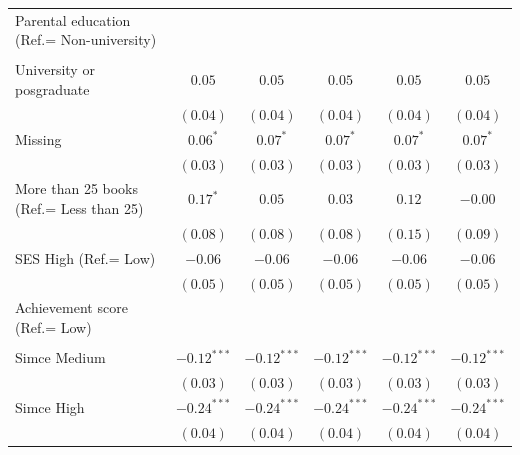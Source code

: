 \documentclass[
  12pt,
  letterpaper,
]{article}
\begin{document}
\begin{table}
{\begin{center}
{\begin{threeparttable}
\begin{tabular}{l c c c c c}
Parental education (Ref.= Non-university)   &               &               &               &               &               \\
                                            &               &               &               &               &               \\
\quad University or posgraduate             & $0.05$        & $0.05$        & $0.05$        & $0.05$        & $0.05$        \\
                                            & $(0.04)$      & $(0.04)$      & $(0.04)$      & $(0.04)$      & $(0.04)$      \\
\quad Missing                               & $0.06^{*}$    & $0.07^{*}$    & $0.07^{*}$    & $0.07^{*}$    & $0.07^{*}$    \\
                                            & $(0.03)$      & $(0.03)$      & $(0.03)$      & $(0.03)$      & $(0.03)$      \\
More than 25 books (Ref.= Less than 25)     & $0.17^{*}$    & $0.05$        & $0.03$        & $0.12$        & $-0.00$       \\
                                            & $(0.08)$      & $(0.08)$      & $(0.08)$      & $(0.15)$      & $(0.09)$      \\
SES High (Ref.= Low)                        & $-0.06$       & $-0.06$       & $-0.06$       & $-0.06$       & $-0.06$       \\
                                            & $(0.05)$      & $(0.05)$      & $(0.05)$      & $(0.05)$      & $(0.05)$      \\
Achievement score (Ref.= Low)               &               &               &               &               &               \\
                                            &               &               &               &               &               \\
\quad Simce Medium                          & $-0.12^{***}$ & $-0.12^{***}$ & $-0.12^{***}$ & $-0.12^{***}$ & $-0.12^{***}$ \\
                                            & $(0.03)$      & $(0.03)$      & $(0.03)$      & $(0.03)$      & $(0.03)$      \\
\quad Simce High                            & $-0.24^{***}$ & $-0.24^{***}$ & $-0.24^{***}$ & $-0.24^{***}$ & $-0.24^{***}$ \\
                                            & $(0.04)$      & $(0.04)$      & $(0.04)$      & $(0.04)$      & $(0.04)$      \\

\end{tabular}
\end{threeparttable}}
\end{center}}
\end{table}
\end{document}
